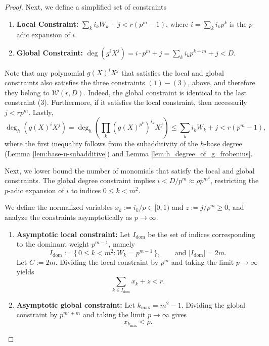 \documentclass[11pt]{article}
\theoremstyle{plain}
\theoremstyle{definition}
\begin{document}
\begin{proof}
Next, we define a simplified set of constraints 
\begin{enumerate}
      \item \textbf{Local Constraint:} $\sum_ki_kW_k + j < r (p^m-1)$, where $i=\sum_ki_kp^k$ is the $p$-adic expansion of $i.$
    \item \textbf{Global Constraint:} $\deg(g^i X^j) = i \cdot p^m + j=\sum_k i_kp^{k+m}+j < D$.
 
\end{enumerate}
Note that any polynomial $g(X)^iX^j$ that satisfies the local and global constraints also satisfies the three constraints $(1)-(3)$, above, and therefore they belong to $\mathcal{W}(r,D).$ Indeed, the global constraint is identical to the last constraint (3). Furthermore, if it satisfies the local constraint, then necessarily $j< rp^m$. Lastly, 
$$\deg_h(g(X)^iX^j)=
\deg_h\left(\prod_k \left(g(X)^{p^k}\right)^{i_k} X^j\right)
\leq \sum_ki_kW_k+j<r(p^m-1),$$
where the first inequality follows from the subadditivity of the $h$-base degree (Lemma \ref{lem:base-u-subadditive}) and Lemma \ref{lem:h_degree_of_g_frobenius}. 

Next, we lower bound the number of monomials that satisfy the local and global  constraints. 
The global degree constraint implies $i < D/p^m \approx \rho p^{m^2}$, restricting the $p$-adic expansion of $i$ to indices $0 \le k < m^2$. 





 We define the normalized variables $x_k := i_k/p \in [0,1)$ and $z := j/p^m \ge 0$, and analyze the constraints asymptotically as $p\to\infty$.

\begin{enumerate}
\item \textbf{Asymptotic local constraint:}
Let $I_{\mathrm{dom}}$ be the set of indices corresponding to the dominant weight $p^{m-1}$, namely
\[
I_{\mathrm{dom}}
:=
\{\,0\le k<m^2 : W_k=p^{m-1}\,\},
\qquad\text{and } |I_{\mathrm{dom}}|=2m.
\]
Let $C:=2m$. Dividing the local constraint by $p^m$ and taking the limit $p\to\infty$ yields
\begin{equation}
\label{eq:asy-local-const}
\sum_{k\in I_{\mathrm{dom}}} x_k + z < r.
\end{equation}

\item \textbf{Asymptotic global constraint:}
Let $k_{\max}=m^2-1$. Dividing the global constraint by $p^{m^2+m}$ and taking the limit $p\to\infty$ gives
\begin{equation}
\label{eq:asy-global-const}
x_{k_{\max}} < \rho.
\end{equation}
\end{enumerate}


\end{proof}
\end{document}
